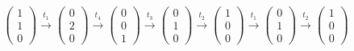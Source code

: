 \begin{align*}
\begin{pmatrix}
1\\1\\0
\end{pmatrix}
\overset{t_1}{\rightarrow}
\begin{pmatrix}
0\\2\\0
\end{pmatrix}
\overset{t_4}{\rightarrow}
\begin{pmatrix}
0\\0\\1
\end{pmatrix}
\overset{t_3}{\rightarrow}
\begin{pmatrix}
0\\1\\0
\end{pmatrix}
\overset{t_2}{\rightarrow}
\begin{pmatrix}
1\\0\\0
\end{pmatrix}
\overset{t_1}{\rightarrow}
\begin{pmatrix}
0\\1\\0
\end{pmatrix}
\overset{t_2}{\rightarrow}
\begin{pmatrix}
1\\0\\0
\end{pmatrix}
\end{align*}